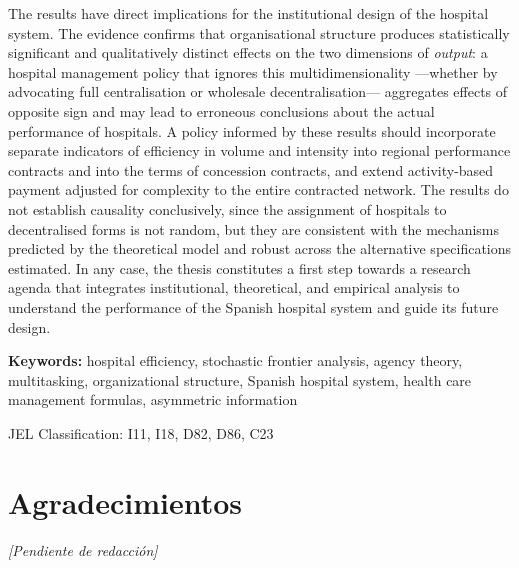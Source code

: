 The results have direct implications for the institutional design 
of the hospital system. The evidence confirms that organisational 
structure produces statistically significant and qualitatively 
distinct effects on the two dimensions of \textit{output}: a 
hospital management policy that ignores this multidimensionality 
---whether by advocating full centralisation or wholesale 
decentralisation--- aggregates effects of opposite sign and may 
lead to erroneous conclusions about the actual performance of 
hospitals. A policy informed by these results should incorporate 
separate indicators of efficiency in volume and intensity into 
regional performance contracts and into the terms of concession 
contracts, and extend activity-based payment adjusted for complexity 
to the entire contracted network. The results do not establish 
causality conclusively, since the assignment of hospitals to 
decentralised forms is not random, but they are consistent with 
the mechanisms predicted by the theoretical model and robust across 
the alternative specifications estimated. In any case, the thesis 
constitutes a first step towards a research agenda that integrates 
institutional, theoretical, and empirical analysis to understand 
the performance of the Spanish hospital system and guide its 
future design.

\medskip
\noindent
\textbf{Keywords:} hospital efficiency, stochastic frontier analysis, agency theory, multitasking, organizational structure, Spanish hospital system, health care management formulas, asymmetric information

\medskip
\noindent JEL Classification: I11, I18, D82, D86, C23

\chapter*{Agradecimientos}
\vspace{2cm}
\begin{center}
\textit{[Pendiente de redacción]}
\end{center}

\tableofcontents
\listoftables
\listoffigures
